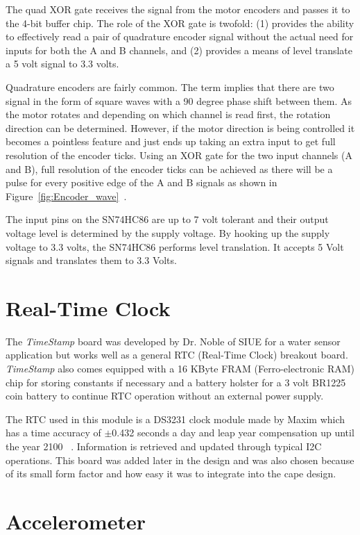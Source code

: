 \documentclass[12pt,oneside,final]{siuethesis}
\theoremstyle{definition}
\begin{document}
The quad XOR gate receives the signal from the motor encoders and passes it to the 4-bit buffer chip. The role of the XOR gate is twofold: (1)  provides the ability to effectively read a pair of quadrature encoder signal without the actual need for inputs for both the A and B channels, and (2) provides a means of level translate a 5 volt signal to 3.3 volts. 

Quadrature encoders are fairly common. The term implies that there are two signal in the form of square waves with a 90 degree phase shift between them. As the motor rotates and depending on which channel is read first, the rotation direction can be determined. However, if the motor direction is being controlled it becomes a pointless feature and just ends up taking an extra input to get full resolution of the encoder ticks. Using an XOR gate for the two input channels (A and B), full resolution of the encoder ticks can be achieved as there will be a pulse for every positive edge of the A and B signals as shown in Figure~\ref{fig:Encoder_wave}~\cite{encoder}. 

The input pins on the SN74HC86 are up to 7 volt tolerant and their output voltage level is determined by the supply voltage. By hooking up the supply voltage to 3.3 volts, the SN74HC86 performs level translation. It accepts 5 Volt signals and translates them to 3.3 Volts. 

\section{Real-Time Clock}

The \emph{TimeStamp} board was developed by Dr. Noble of SIUE for a water sensor application but works well as a general RTC  (Real-Time Clock) breakout board. \emph{TimeStamp} also comes equipped with a 16 KByte FRAM (Ferro-electronic RAM) chip for storing constants if necessary and a battery holster for a 3 volt BR1225 coin battery to continue RTC operation without an external power supply. 

The RTC used in this module is a DS3231 clock module made by Maxim which has a time accuracy of $\pm$0.432 seconds a day and leap year compensation up until the year 2100 ~\cite{DS3231M}. Information is retrieved and updated through typical I2C operations. This board was added later in the design and was also chosen because of its small form factor and how easy it was to integrate into the cape design. 


\section{Accelerometer}
\end{document}
